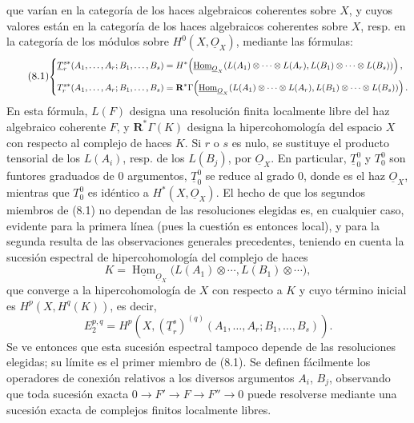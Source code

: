 \documentclass[11pt,twoside,openany]{book}
\numberwithin{equation}{section}
\newcommand{\src}[1]{%
  \phantomsection\hypertarget{src:#1}{}%
  \marginpar{\raggedleft\footnotesize\sffamily #1}%
}
\newcommand{\Osh}{\underline{O}}
\newcommand{\Homsh}{\underline{\operatorname{Hom}}}
\theoremstyle{plain}
\theoremstyle{definition}
\theoremstyle{remark}
\newcommand{\FgaUnitKey}{frontmatter}
\renewcommand{\src}[1]{%
  \phantomsection\hypertarget{src:\FgaUnitKey:#1}{}%
  \marginpar{\raggedleft\footnotesize\sffamily #1}%
}
\theoremstyle{plain}
\theoremstyle{definition}
\theoremstyle{remark}
\begin{document}
\src{190}
que varían en la categoría de los haces algebraicos coherentes sobre $X$, y cuyos
valores están en la categoría de los haces algebraicos coherentes sobre $X$,
resp. en la categoría de los módulos sobre $H^{0}(X,\Osh_X)$, mediante las fórmulas:
\begin{equation}\tag{8.1}
\resizebox{\textwidth}{!}{$
\left\{
\begin{aligned}
\underline{T}_{r}^{s*}(A_1,\ldots,A_r;B_1,\ldots,B_s)
  &={}H^{*}\!\left(
    \Homsh_{\Osh_X}\!\left(
      L(A_1)\otimes\cdots\otimes L(A_r),
      L(B_1)\otimes\cdots\otimes L(B_s)
    \right)\right),\\[3pt]
T_{r}^{s*}(A_1,\ldots,A_r;B_1,\ldots,B_s)
  &={}\mathbf R^{*}\Gamma\!\left(
    \Homsh_{\Osh_X}\!\left(
      L(A_1)\otimes\cdots\otimes L(A_r),
      L(B_1)\otimes\cdots\otimes L(B_s)
    \right)\right).
\end{aligned}
\right.
$}
\end{equation}
En esta fórmula, $L(F)$ designa una resolución finita localmente libre del
haz algebraico coherente $F$, y $\mathbf R^{*}\Gamma(K)$ designa
la hipercohomología del espacio $X$ con respecto al complejo de haces $K$. Si
$r$ o $s$ es nulo, se sustituye el producto tensorial de los $L(A_i)$, resp. de los
$L(B_j)$, por $\Osh_X$. En particular, $\underline{T}_{0}^{0}$ y $T_{0}^{0}$
son funtores graduados de 0 argumentos, $\underline{T}_{0}^{0}$ se reduce al
grado 0, donde es el haz $\Osh_X$, mientras que $T_{0}^{0}$ es idéntico a
$H^{*}(X,\Osh_X)$. El hecho de que los segundos miembros de (8.1) no dependan
de las resoluciones elegidas es, en cualquier caso, evidente para la primera línea
(pues la cuestión es entonces local), y para la segunda resulta de las observaciones
generales precedentes, teniendo en cuenta la sucesión espectral de
hipercohomología del complejo de haces
\[
  K=\Homsh_{\Osh_X}\bigl(L(A_1)\otimes\cdots,
      L(B_1)\otimes\cdots\bigr),
\]
que converge a la hipercohomología de $X$ con respecto a $K$ y cuyo término
inicial es $H^{p}(X,H^{q}(K))$, es decir,
\begin{equation}\tag{8.2}
  E_{2}^{p,q}
  =H^{p}\!\left(X,
    (\underline{T}_{r}^{s})^{(q)}
      (A_1,\ldots,A_r;B_1,\ldots,B_s)\right).
\end{equation}
Se ve entonces que esta sucesión espectral tampoco depende de las resoluciones
elegidas; su límite es el primer miembro de (8.1). Se definen
fácilmente los operadores de conexión relativos a los diversos argumentos $A_i$, $B_j$,
observando que toda sucesión exacta
$0\longrightarrow F'\longrightarrow F\longrightarrow F''\longrightarrow0$
puede resolverse mediante una sucesión exacta de complejos finitos localmente libres.
\end{document}
